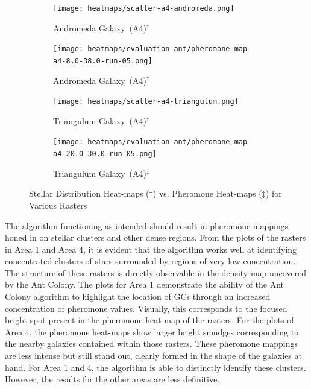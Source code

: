 \begin{figure}[H]
    \begin{subfigure}[b]{0.241\textwidth}
        \centering
        \captionsetup{justification=centering,format=hang}
        \texttt{[image: heatmaps/scatter-a4-andromeda.png]}
        \caption{\label{fig:scatter-andromeda}Andromeda Galaxy~(A4)$^{\dagger}$}
    \end{subfigure}
    \begin{subfigure}[b]{0.241\textwidth}
        \centering
        \captionsetup{justification=centering,format=hang}
        \texttt{[image: heatmaps/evaluation-ant/pheromone-map-a4-8.0-38.0-run-05.png]}
        \caption{\label{fig:heat-andromeda}Andromeda Galaxy~(A4)$^{\ddagger}$}
    \end{subfigure}
    \hspace{0.3em}
    \begin{subfigure}[b]{0.241\textwidth}
        \centering
        \captionsetup{justification=centering,format=hang}
        \texttt{[image: heatmaps/scatter-a4-triangulum.png]}
        \caption{\label{fig:scatter-triangulum}Triangulum Galaxy~(A4)$^{\dagger}$}
    \end{subfigure}
    \begin{subfigure}[b]{0.241\textwidth}
        \centering
        \captionsetup{justification=centering,format=hang}
        \texttt{[image: heatmaps/evaluation-ant/pheromone-map-a4-20.0-30.0-run-05.png]}
        \caption{\label{fig:heat-triangulum}Triangulum Galaxy~(A4)$^{\ddagger}$}
    \end{subfigure}

    \caption{\label{fig:scatterplot-heatmaps} Stellar Distribution Heat-maps ($\dagger$) vs. Pheromone Heat-maps ($\ddagger$) for Various Rasters}
\end{figure}

The algorithm functioning as intended should result in pheromone mappings honed
in on stellar clusters and other dense regions. From the plots of the rasters in
Area 1 and Area 4, it is evident that the algorithm works well at identifying
concentrated clusters of stars surrounded by regions of very low concentration.
The structure of these rasters is directly observable in the density map
uncovered by the Ant Colony. The plots for Area 1 demonstrate the ability of the
Ant Colony algorithm to highlight the location of GCs through an increased
concentration of pheromone values. Visually, this corresponds to the focused
bright spot present in the pheromone heat-map of the rasters. For the plots of
Area 4, the pheromone heat-maps show larger bright smudges corresponding to the
nearby galaxies contained within those rasters. These pheromone mappings are
less intense but still stand out, clearly formed in the shape of the galaxies at
hand. For Area 1 and 4, the algorithm is able to distinctly identify these
clusters. However, the results for the other areas are less definitive.

